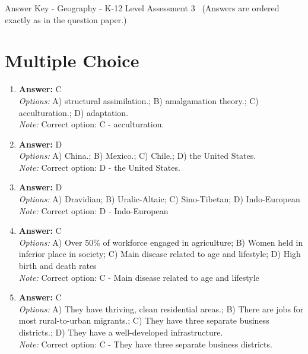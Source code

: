 \documentclass[12pt]{article}
\begin{document}
\begin{center}
Answer Key - Geography - K-12 Level Assessment 3 \
\small (Answers are ordered exactly as in the question paper.)
\end{center}

\section*{Multiple Choice}
\begin{enumerate}[label=\arabic*.]
\item \textbf{Answer:} C
\\ \textit{Options:} A) structural assimilation.; B) amalgamation theory.; C) acculturation.; D) adaptation.
\\ \textit{Note:} Correct option: C - acculturation.
\item \textbf{Answer:} D
\\ \textit{Options:} A) China.; B) Mexico.; C) Chile.; D) the United States.
\\ \textit{Note:} Correct option: D - the United States.
\item \textbf{Answer:} D
\\ \textit{Options:} A) Dravidian; B) Uralic-Altaic; C) Sino-Tibetan; D) Indo-European
\\ \textit{Note:} Correct option: D - Indo-European
\item \textbf{Answer:} C
\\ \textit{Options:} A) Over 50\% of workforce engaged in agriculture; B) Women held in inferior place in society; C) Main disease related to age and lifestyle; D) High birth and death rates
\\ \textit{Note:} Correct option: C - Main disease related to age and lifestyle
\item \textbf{Answer:} C
\\ \textit{Options:} A) They have thriving, clean residential areas.; B) There are jobs for most rural-to-urban migrants.; C) They have three separate business districts.; D) They have a well-developed infrastructure.
\\ \textit{Note:} Correct option: C - They have three separate business districts.
\end{enumerate}
\end{document}
